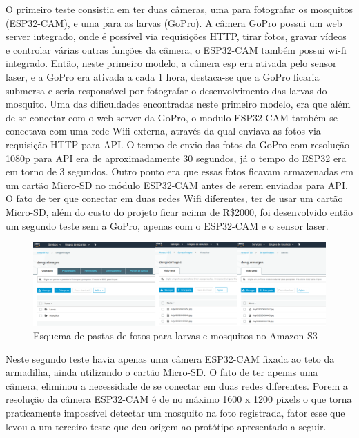 \documentclass[
	12pt,				%
	openright,			%
	oneside,			%
	a4paper,			%
	chapter=TITLE,		%
	english,			%
	brazil				%
	]{abntex2}
\begin{document}
O primeiro teste consistia em ter duas câmeras, uma para fotografar 
os mosquitos (ESP32-CAM), e uma para as larvas (GoPro). A câmera GoPro possui um web server integrado, onde é possível via requisições HTTP, tirar fotos, gravar vídeos e controlar 
várias outras funções da câmera, o ESP32-CAM também possui wi-fi integrado. Então, neste primeiro modelo, a câmera esp era ativada pelo sensor laser, e a GoPro era ativada a cada 1 hora, 
destaca-se que a GoPro ficaria submersa e seria responsável por fotografar o desenvolvimento das larvas do mosquito. 
Uma das dificuldades encontradas neste primeiro modelo, era que além de se conectar com o web server da GoPro, 
o modulo ESP32-CAM também se conectava com uma rede Wifi externa, através da qual enviava as fotos via requisição HTTP para API. 
O tempo de envio das fotos da GoPro com resolução 1080p para API era de aproximadamente 30 segundos, já o tempo do ESP32 era em torno de 3 segundos. 
Outro ponto era que essas fotos ficavam armazenadas em um cartão Micro-SD no módulo ESP32-CAM antes de serem enviadas para API. O fato de ter que conectar em duas redes Wifi diferentes, 
ter de usar um cartão Micro-SD, além do custo do projeto ficar acima de R\$2000, foi desenvolvido então um segundo teste sem a GoPro, apenas 
com o ESP32-CAM e o sensor laser.

\begin{figure}[H]
    \centering
    \includegraphics[scale=0.2]{imagens/larvasMosquitos.png}
    \caption{Esquema de pastas de fotos para larvas e mosquitos no Amazon S3}
        \label{fig:larvasMosquitos}
    \end{figure}

Neste segundo teste havia apenas uma câmera ESP32-CAM fixada ao teto da armadilha, ainda utilizando o cartão Micro-SD. O fato de ter apenas uma câmera, eliminou a necessidade 
de se conectar em duas redes diferentes. Porem a resolução da câmera ESP32-CAM é de no máximo 1600 x 1200 pixels o que torna praticamente impossível detectar um mosquito na 
foto registrada, fator esse que levou a um terceiro teste que deu origem ao protótipo apresentado a seguir.
\end{document}
